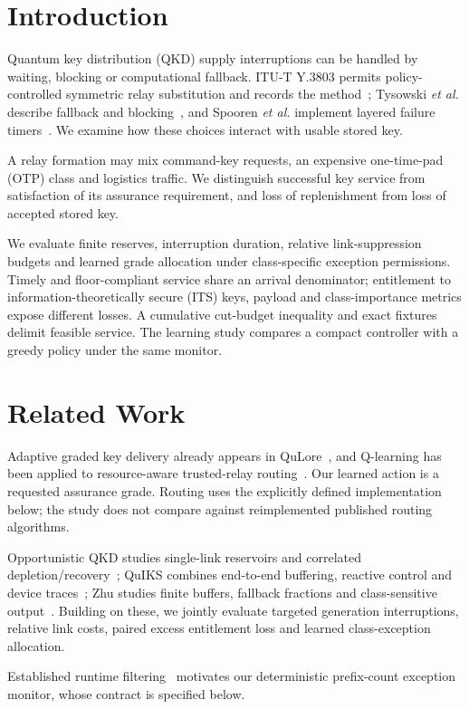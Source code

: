 \documentclass[conference,a4paper]{IEEEtran}
\begin{document}
\section{Introduction}
Quantum key distribution (QKD) supply interruptions can be handled by waiting, blocking or computational fallback. ITU-T Y.3803 permits policy-controlled symmetric relay substitution and records the method~\cite{itu}; Tysowski \emph{et al.} describe fallback and blocking~\cite{tysowski}, and Spooren \emph{et al.} implement layered failure timers~\cite{spooren}. We examine how these choices interact with usable stored key.

A relay formation may mix command-key requests, an expensive one-time-pad (OTP) class and logistics traffic. We distinguish successful key service from satisfaction of its assurance requirement, and loss of replenishment from loss of accepted stored key.

We evaluate finite reserves, interruption duration, relative link-suppression budgets and learned grade allocation under class-specific exception permissions. Timely and floor-compliant service share an arrival denominator; entitlement to information-theoretically secure (ITS) keys, payload and class-importance metrics expose different losses. A cumulative cut-budget inequality and exact fixtures delimit feasible service. The learning study compares a compact controller with a greedy policy under the same monitor.

\section{Related Work}
Adaptive graded key delivery already appears in QuLore~\cite{qulore}, and Q-learning has been applied to resource-aware trusted-relay routing~\cite{hao}. Our learned action is a requested assurance grade. Routing uses the explicitly defined implementation below; the study does not compare against reimplemented published routing algorithms.

Opportunistic QKD studies single-link reservoirs and correlated depletion/recovery~\cite{opportunistic}; QuIKS combines end-to-end buffering, reactive control and device traces~\cite{quiks}; Zhu studies finite buffers, fallback fractions and class-sensitive output~\cite{zhu}. Building on these, we jointly evaluate targeted generation interruptions, relative link costs, paired excess entitlement loss and learned class-exception allocation.

Established runtime filtering~\cite{shield} motivates our deterministic prefix-count exception monitor, whose contract is specified below.
\end{document}
